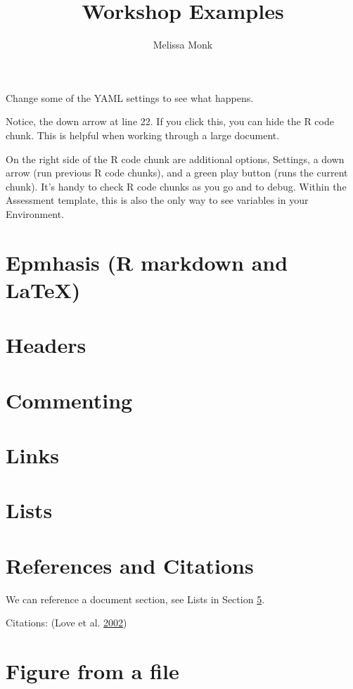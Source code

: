 \documentclass[12pt,]{article}
\title{Workshop Examples}
\author{Melissa Monk}
\date{}
\begin{document}
\maketitle

{
\setcounter{tocdepth}{4}
\tableofcontents
}
Change some of the YAML settings to see what happens.

Notice, the down arrow at line 22. If you click this, you can hide the R
code chunk. This is helpful when working through a large document.

On the right side of the R code chunk are additional options, Settings,
a down arrow (run previous R code chunks), and a green play button (runs
the current chunk). It's handy to check R code chunks as you go and to
debug. Within the Assessment template, this is also the only way to see
variables in your Environment.

\section{Epmhasis (R markdown and
LaTeX)}\label{epmhasis-r-markdown-and-latex}

\section{Headers}\label{headers}

\section{Commenting}\label{commenting}

\section{Links}\label{links}

\section{Lists}\label{lists}

\section{References and Citations}\label{references-and-citations}

We can reference a document section, see Lists in Section \ref{lists}.

Citations: (Love et al. \protect\hyperlink{ref-Love2002}{2002})

\section{Figure from a file}\label{figure-from-a-file}
\end{document}
